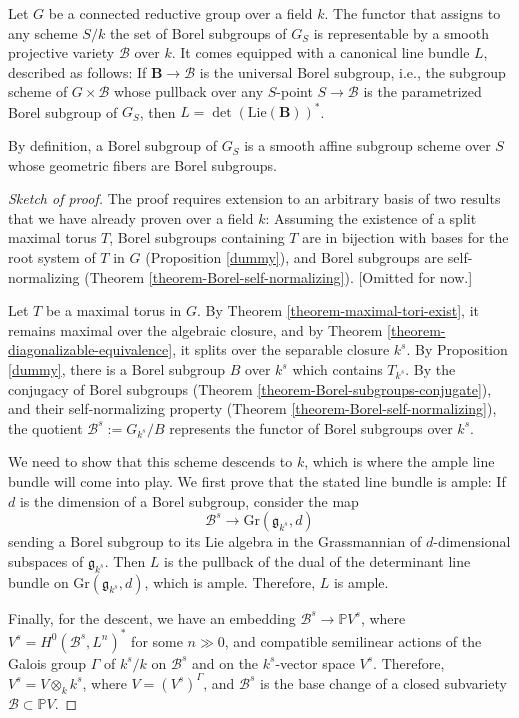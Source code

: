 \begin{theorem}
 \label{theorem-variety-of-Borels}
Let $G$ be a connected reductive group over a field $k$. The functor that assigns to any scheme $S/k$ the set of Borel subgroups of $G_S$ is representable by a smooth projective variety $\mathcal B$ over $k$. It comes equipped with a canonical line bundle $L$, described as follows: If $\mathbf B\to \mathcal B$ is the universal Borel subgroup, i.e., the subgroup scheme of $G\times \mathcal B$ whose pullback over any $S$-point $S\to \mathcal B$ is the parametrized Borel subgroup of $G_S$, then $L=\det(\text{Lie}(\mathbf B))^*$.
\end{theorem}

By definition, a Borel subgroup of $G_S$ is a smooth affine subgroup scheme over $S$ whose geometric fibers are Borel subgroups. 

\begin{proof}[Sketch of proof]
 The proof requires extension to an arbitrary basis of two results that we have already proven over a field $k$: Assuming the existence of a split maximal torus $T$, Borel subgroups containing $T$ are in bijection with bases for the root system of $T$ in $G$ (Proposition \ref{dummy}), and Borel subgroups are self-normalizing (Theorem \ref{theorem-Borel-self-normalizing}). [Omitted for now.]
 
 Let $T$ be a maximal torus in $G$. By Theorem \ref{theorem-maximal-tori-exist}, it remains maximal over the algebraic closure, and by  Theorem \ref{theorem-diagonalizable-equivalence}, it splits over the separable closure $k^s$. By Proposition \ref{dummy}, there is a Borel subgroup $B$ over $k^s$ which contains $T_{k^s}$. By the conjugacy of Borel subgroups (Theorem \ref{theorem-Borel-subgroups-conjugate}), and their self-normalizing property (Theorem \ref{theorem-Borel-self-normalizing}), the quotient $\mathcal B^s:=G_{k^s}/B$ represents the functor of Borel subgroups over $k^s$. 
 
 We need to show that this scheme descends to $k$, which is where the ample line bundle will come into play. We first prove that the stated line bundle is ample: If $d$ is the dimension of a Borel subgroup, consider the map 
 $$ \mathcal B^s \to \text{Gr}(\mathfrak g_{k^s}, d)$$
 sending a Borel subgroup to its Lie algebra in the Grassmannian of $d$-dimensional subspaces of $\mathfrak g_{k^s}$. Then $L$ is the pullback of the dual of the determinant line bundle on $\text{Gr}(\mathfrak g_{k^s}, d)$, which is ample. Therefore, $L$ is ample.
 
 Finally, for the descent, we have an embedding $\mathcal B^s\to \mathbb P V^s$, where $V^s = H^0(\mathcal B^s, L^n)^*$ for some $n\gg 0$, and compatible semilinear actions of the Galois group $\Gamma$ of $k^s/k$ on $\mathcal B^s$ and on the $k^s$-vector space $V^s$. Therefore, $V^s = V \otimes_k k^s$, where $V = (V^s)^\Gamma$, and $\mathcal B^s$ is the base change of a closed subvariety $\mathcal B \subset \mathbb P V$.
\end{proof}


